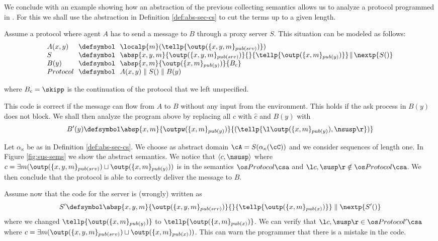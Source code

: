 \documentclass{tlp}
\begin{document}
We conclude with an example showing  how an abstraction of the previous collecting semantics allows us to analyze a protocol programmed in \utcc.  For this we shall use the abstraction in Definition \ref{def:abs-sec-cs} to cut the terms up to a given length. 
\begin{example}\label{ex:sus-pro}
Assume a protocol where agent $A$ 
has to send a message to $B$ through a proxy server $S$. This situation can be modeled as follows:
\[
\begin{array}{lll}
	A(x,y) &\!\!\defsymbol\!\!& \localp{m}(\tellp{\outp(\{x,y,m\}_{pub(srv)})}) \\
	S &\!\!\defsymbol\!\!& \absp{x,y,m}{\outp(\{x,y,m\}_{pub(srv)})}{}{\tellp{\outp(\{x,m\}_{pub(y)})}} \!\parallel\! \nextp{S()}\\
	B(y) &\!\!\defsymbol\!\!& \absp{x,m}{\outp(\{x,m\}_{pub(y)})}{B_c} \\
	Protocol   &\!\!\defsymbol\!\!& A(x,y) \parallel S() \parallel B(y)
\end{array}
\]

where  $B_c=\skipp$ is the continuation of the protocol that we left unspecified.

This code is correct if  the message can flow  from $A$ to $B$ without any input from the environment.   
This holds if the ask process in $B(y)$ does not block. We shall then analyze the program above by replacing all   $c$ with  $\widehat{c}$ and   $B(y)$ with 
\[
B'(y) \defsymbol \absp{x,m}{\outpw(\{x,m\}_{pub(y)})}{(\tellp{\l \outp(\{x,m\}_{pub(y)}), \nsusp \r})} 
\]

Let $\alpha_\kappa$ be as in  Definition  \ref{def:abs-sec-cs}. We choose as abstract domain $\cA=S(\alpha_\kappa(\cC))$ and  we  consider sequences of length one. 
In  Figure \ref{fig:sus-sems} we show the abstract semantics.  We notice that $\langle c, \nsusp \rangle$ where $c=
\exists m (\outp(\{x,y,m\}_{pub(srv)}) \sqcup \outp(\{x,m\}_{pub(y)}) )
$ is in the semantics $\os Protocol\csa$ and $\l c,\susp\r \notin \os Protocol \csa$.  We then conclude that the protocol is able to correctly deliver the message to $B$. 

Assume now that the code for the server is (wrongly) written as 
\[
S' \defsymbol \absp{x,y,m}{\outp(\{x,y,m\}_{pub(srv)})}{}{\tellp{\outp(\{x,m\}_{pub(x)})}} \parallel \nextp{S'()}
\]
where we changed $\tellp{\outp(\{x,m\}_{pub(y)})}$ to $\tellp{\outp(\{x,m\}_{pub(x)})}$. 
We can verify that  $\l c,\susp \r \in \os Protocol'\csa$  where 
$c= \exists m (\outp(\{x,y,m\}_{pub(srv)}) \sqcup \outp(\{x,m\}_{pub(x)}) )$. This can warn the programmer that there is a mistake in the code. 
\end{example}
\end{document}
